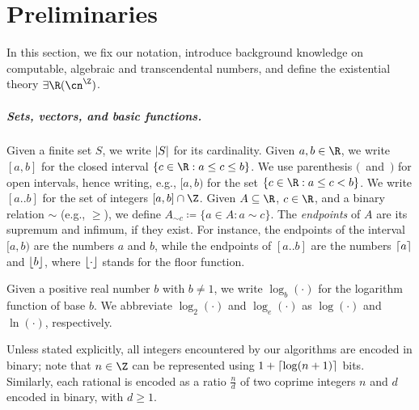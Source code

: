 \section{Preliminaries}
\label{sec:preliminaries}

In this section, we fix our notation, introduce background knowledge on
computable, algebraic and transcendental numbers, and define the
existential theory $\exists\R(\ipow{\cn})$.

\subparagraph*{Sets, vectors, and basic functions.}
Given a finite set $S$, we write $\left|S\right|$ for its cardinality. Given $a,b \in
\R$, we write $[a,b]$ for the closed interval $\{ c \in \R : a \leq c \leq b
\}$. We use parenthesis \mbox{$($ and $)$} for open intervals, hence writing,
e.g., $[a,b)$ for the set $\{ c \in \R : a \leq c < b\}$. We write $[a..b]$ for
the set of integers $[a,b] \cap \Z$. Given $A \subseteq \R$, $c \in \R$, and a
binary relation $\sim$ (e.g., $\geq$), we define $A_{\sim c} \coloneqq {\{a \in
A : a \sim c\}}$. The \emph{endpoints} of $A$ are its supremum and infimum, if
they exist. For instance, the endpoints of the interval $[a,b)$ are the numbers
$a$ and $b$, while the endpoints of $[a..b]$ are the numbers $\left\lceil a\right\rceil$ and
$\left\lfloor b\right\rfloor$, where $\left\lfloor\cdot\right\rfloor$ stands for the floor function. 

Given a positive real number $b$ with $b \neq 1$, we write $\log_b(\cdot)$ for
the logarithm function of base $b$. We abbreviate $\log_2(\cdot)$ and
$\log_e(\cdot)$ as $\log(\cdot)$ and $\ln(\cdot)$, respectively. 

Unless stated explicitly, all integers encountered by our algorithms are encoded
in binary; note that $n \in \Z$ can be represented using $1+\left\lceil\log(n+1)\right\rceil$
bits. Similarly, each rational is encoded as a ratio  $\frac{n}{d}$ of two
coprime integers $n$ and $d$ encoded in binary, with $d \geq 1$.

